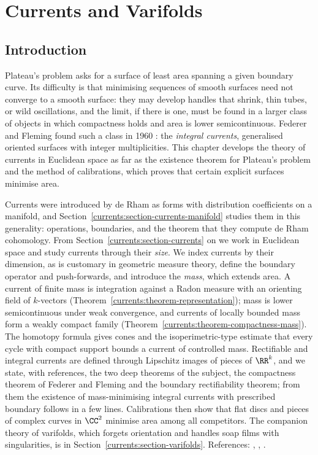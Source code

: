 \chapter{Currents and Varifolds}\label{currents}

\section{Introduction}\label{currents:section-introduction}

Plateau's problem asks for a surface of least area spanning a given boundary curve. Its difficulty is that minimising sequences of smooth surfaces need not converge to a smooth surface: they may develop
handles that shrink, thin tubes, or wild oscillations, and the limit, if there is one, must be found in a larger class of objects in which compactness holds and area is lower semicontinuous. Federer and
Fleming found such a class in 1960 \cite{federer-fleming-1960}: the \emph{integral currents}, generalised oriented surfaces with integer multiplicities. This chapter develops the theory of currents in
Euclidean space as far as the existence theorem for Plateau's problem and the method of calibrations, which proves that certain explicit surfaces minimise area.

Currents were introduced by de Rham as forms with distribution coefficients on a manifold, and Section~\ref{currents:section-currents-manifold} studies them in this generality: operations, boundaries, and
the theorem that they compute de Rham cohomology. From Section~\ref{currents:section-currents} on we work in Euclidean space and study currents through their \emph{size}. We index currents by their dimension, as is customary in geometric measure theory, define the boundary operator and push-forwards, and introduce the \emph{mass}, which extends area. A
current of finite mass is integration against a Radon measure with an orienting field of $k$-vectors (Theorem~\ref{currents:theorem-representation}); mass is lower semicontinuous under weak convergence, and
currents of locally bounded mass form a weakly compact family (Theorem~\ref{currents:theorem-compactness-mass}). The homotopy formula gives cones and the isoperimetric-type estimate that every cycle with
compact support bounds a current of controlled mass. Rectifiable and integral currents are defined through Lipschitz images of pieces of $\RR^k$, and we state, with references, the two deep theorems of
the subject, the compactness theorem of Federer and Fleming and the boundary rectifiability theorem; from them the existence of mass-minimising integral currents with prescribed boundary follows in a few
lines. Calibrations then show that flat discs and pieces of complex curves in $\CC^2$ minimise area among all competitors. The companion theory of varifolds, which forgets orientation and handles soap films
with singularities, is in Section~\ref{currents:section-varifolds}. References: \cite{federer-gmt}, \cite{simon-gmt}, \cite{federer-fleming-1960}.

